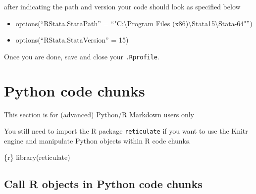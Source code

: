 \documentclass[
  letterpaper,
  DIV=11,
  numbers=noendperiod]{scrreprt}
\newenvironment{Shaded}{\begin{snugshade}}{\end{snugshade}}
\newcommand{\FunctionTok}[1]{\textcolor[rgb]{0.28,0.35,0.67}{#1}}
\newcommand{\InformationTok}[1]{\textcolor[rgb]{0.37,0.37,0.37}{#1}}
\newcommand{\NormalTok}[1]{\textcolor[rgb]{0.00,0.23,0.31}{#1}}
\providecommand{\tightlist}{%
  \setlength{\itemsep}{0pt}\setlength{\parskip}{0pt}}\usepackage{longtable,booktabs,array}
\begin{document}
after indicating the path and version your code should look as specified
below

\begin{itemize}
\tightlist
\item
  options(``RStata.StataPath'' = ``"C:\textbackslash Program Files
  (x86)\textbackslash Stata15\textbackslash Stata-64"'')
\item
  options(``RStata.StataVersion'' = 15)
\end{itemize}

Once you are done, save and close your \texttt{.Rprofile}.

\hypertarget{python-code-chunks}{%
\section{Python code chunks}\label{python-code-chunks}}

\begin{tcolorbox}[enhanced jigsaw, colframe=quarto-callout-warning-color-frame, colback=white, rightrule=.15mm, bottomrule=.15mm, left=2mm, arc=.35mm, coltitle=black, title=\textcolor{quarto-callout-warning-color}{\faExclamationTriangle}\hspace{0.5em}{Warning}, opacitybacktitle=0.6, bottomtitle=1mm, opacityback=0, toptitle=1mm, toprule=.15mm, colbacktitle=quarto-callout-warning-color!10!white, titlerule=0mm, leftrule=.75mm, breakable]
This section is for (advanced) Python/R Markdown users only
\end{tcolorbox}

You still need to import the R package \texttt{reticulate} if you want
to use the Knitr engine and manipulate Python objects within R code
chunks.

\begin{Shaded}
\begin{Highlighting}[]
\InformationTok{\textasciigrave{}\textasciigrave{}\textasciigrave{}\{r\}}
\FunctionTok{library}\NormalTok{(reticulate)}
\InformationTok{\textasciigrave{}\textasciigrave{}\textasciigrave{}}
\end{Highlighting}
\end{Shaded}

\hypertarget{call-r-objects-in-python-code-chunks}{%
\subsection{Call R objects in Python code
chunks}\label{call-r-objects-in-python-code-chunks}}
\end{document}

